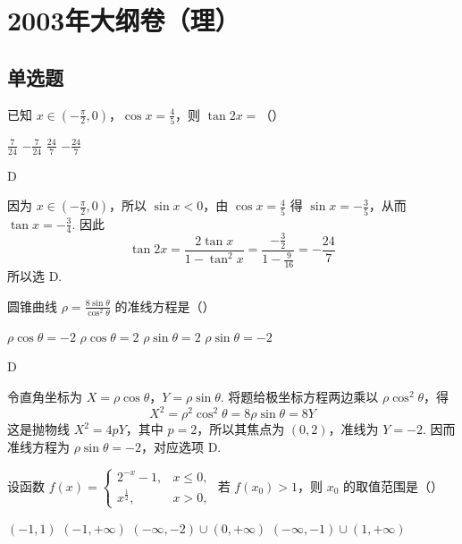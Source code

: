 
\chapter{2003年大纲卷（理）}
\section{单选题}
\begin{problem}
已知 \(x \in \left(-\frac{\pi}{2}, 0\right)\)，\(\cos x = \frac{4}{5}\)，则 \(\tan 2x =\)（\quad）

\choices
    {\(\frac{7}{24}\)}
    {\(-\frac{7}{24}\)}
    {\(\frac{24}{7}\)}
    {\(-\frac{24}{7}\)}
\end{problem}

\begin{answer}
D
\end{answer}

\begin{solution}
因为 \(x\in\left(-\frac{\pi}{2},0\right)\)，所以 \(\sin x<0\)，由 \(\cos x=\frac45\) 得 \(\sin x=-\frac35\)，从而 \(\tan x=-\frac34\). 因此
\[
\tan 2x=\frac{2\tan x}{1-\tan^2x}=\frac{-\frac32}{1-\frac9{16}}=-\frac{24}{7}
\]
所以选 D.
\end{solution}

\begin{problem}
圆锥曲线 \(\rho = \frac{8\sin\theta}{\cos^2\theta}\) 的准线方程是（\quad）

\choices
    {\(\rho \cos \theta = -2\)}
    {\(\rho \cos \theta = 2\)}
    {\(\rho \sin \theta = 2\)}
    {\(\rho \sin \theta = -2\)}
\end{problem}

\begin{answer}
D
\end{answer}

\begin{solution}
令直角坐标为 \(X=\rho\cos\theta\)，\(Y=\rho\sin\theta\). 将题给极坐标方程两边乘以 \(\rho\cos^2\theta\)，得
\[
X^2=\rho^2\cos^2\theta=8\rho\sin\theta=8Y
\]
这是抛物线 \(X^2=4pY\)，其中 \(p=2\)，所以其焦点为 \((0,2)\)，准线为 \(Y=-2\). 因而准线方程为 \(\rho\sin\theta=-2\)，对应选项 D.
\end{solution}

\begin{problem}
设函数 \( f(x) = \begin{cases}
2^{-x} - 1, & x \leqslant 0,\\
x^{\frac{1}{2}}, & x > 0,
\end{cases} \) 若 \( f(x_0) > 1 \)，则 \( x_0 \) 的取值范围是（\quad）

\choices
    {\((-1, 1)\)}
    {\((-1, +\infty)\)}
    {\((-\infty, -2) \cup (0, +\infty)\)}
    {\((-\infty, -1) \cup (1, +\infty)\)}
\end{problem}


